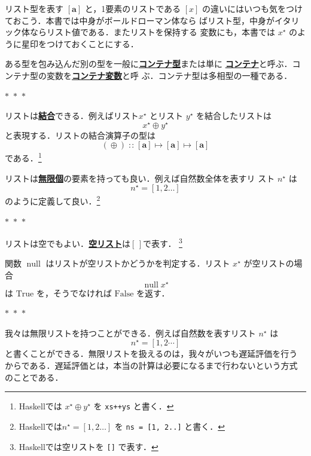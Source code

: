 \documentclass[a5paper,twoside,fleqn,draft]{jsbook}
\newcommand{\separator}{\begin{center}$*$~$*$~$*$\end{center}}
\newcommand{\programminglanguage}[1]{\textsf{#1}}
\newcommand{\haskell}{\programminglanguage{Haskell}}
\newcommand{\keyword}[1]{{\underline{\textbf{#1}}}}
\newcommand{\code}[1]{\texttt{#1}}
\newcommand{\mSpecialConstant}[1]{\textrm{#1}}
\newcommand{\mEmptyList}{{[\,]}}
\newcommand{\mFalse}{\mSpecialConstant{False}}
\newcommand{\mTrue}{\mSpecialConstant{True}}
\newcommand{\mSpecialFunc}[1]{#1}
\DeclareMathOperator{\mNull}{\mSpecialFunc{null}}
\DeclareMathOperator{\mAppend}{\oplus}
\DeclareMathOperator{\mFuncArrow}{\mapsto}
\DeclareMathOperator{\mIn}{{:\!:}}
\newcommand{\mType}[1]{\mathbf{#1}} %
\newcommand{\mA}{\mType{a}}
\newcommand{\mTupleWith}[1]{\left(#1\right)} %
\newcommand{\mList}[1]{{#1}^\mathrm{\star}}
\begin{document}
リスト型を表す $[\mA]$ と，1要素のリストである $[x]$
の違いにはいつも気をつけておこう．本書では中身がボールドローマン体なら
ばリスト型，中身がイタリック体ならリスト値である．またリストを保持する
変数にも，本書では $\mList{x}$ のように星印をつけておくことにする．

ある型を包み込んだ別の型を一般に\keyword{コンテナ型}または単に
\keyword{コンテナ}と呼ぶ．コンテナ型の変数を\keyword{コンテナ変数}と呼
ぶ．コンテナ型は多相型の一種である．


\separator

リストは\keyword{結合}できる．例えばリスト$\mList{x}$ とリスト
$\mList{y}$ を結合したリストは
\begin{equation}
  \mList{x}\mAppend\mList{y}
\end{equation}
と表現する．リストの結合演算子の型は
\begin{equation}
  (\mAppend)
  \mIn[\mA]\mFuncArrow[\mA]\mFuncArrow[\mA]
\end{equation}
である．\footnote{\haskell では $\mList{x}\mAppend\mList{y}$ を
  \code{xs++ys} と書く．}

リストは\keyword{無限個}の要素を持っても良い．例えば自然数全体を表すリ
スト $\mList{n}$ は
\begin{equation}
\mList{n}=[1,2\dots]
\end{equation}
のように定義して良い．\footnote{\haskell では$\mList{n}=[1,2\dots]$ を
  \code{ns = [1, 2..]} と書く．}

\separator

リストは空でもよい．\keyword{空リスト}は$\mEmptyList$で表す．
\footnote{\haskell では空リストを \code{[]} で表す．}

関数 $\mNull$ はリストが空リストかどうかを判定する．リスト $\mList{x}$
が空リストの場合
\begin{equation}
  \mNull\mList{x}
\end{equation}
は $\mTrue$ を，そうでなければ $\mFalse$ を返す．

\separator

我々は無限リストを持つことができる．例えば自然数を表すリスト
$\mList{n}$ は
\begin{equation*}
  \mList{n}
  =[1,2\dotsb]
\end{equation*}
と書くことができる．無限リストを扱えるのは，我々がいつも遅延評価を行う
からである．遅延評価とは，本当の計算は必要になるまで行わないという方式
のことである．
\end{document}
